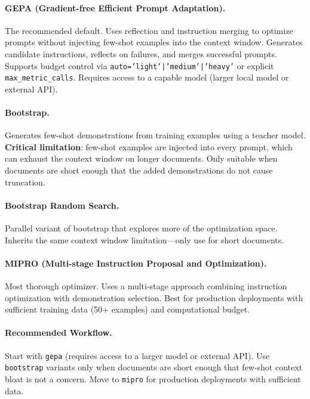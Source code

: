 \paragraph{GEPA (Gradient-free Efficient Prompt Adaptation).}
The recommended default. Uses reflection and instruction merging to optimize prompts without injecting few-shot examples into the context window. Generates candidate instructions, reflects on failures, and merges successful prompts. Supports budget control via \texttt{auto='light'|'medium'|'heavy'} or explicit \texttt{max\_metric\_calls}. Requires access to a capable model (larger local model or external API).

\paragraph{Bootstrap.}
Generates few-shot demonstrations from training examples using a teacher model. \textbf{Critical limitation}: few-shot examples are injected into every prompt, which can exhaust the context window on longer documents. Only suitable when documents are short enough that the added demonstrations do not cause truncation.

\paragraph{Bootstrap Random Search.}
Parallel variant of bootstrap that explores more of the optimization space. Inherits the same context window limitation---only use for short documents.

\paragraph{MIPRO (Multi-stage Instruction Proposal and Optimization).}
Most thorough optimizer. Uses a multi-stage approach combining instruction optimization with demonstration selection. Best for production deployments with sufficient training data (50+ examples) and computational budget.

\paragraph{Recommended Workflow.}
Start with \texttt{gepa} (requires access to a larger model or external API). Use \texttt{bootstrap} variants only when documents are short enough that few-shot context bloat is not a concern. Move to \texttt{mipro} for production deployments with sufficient data.


